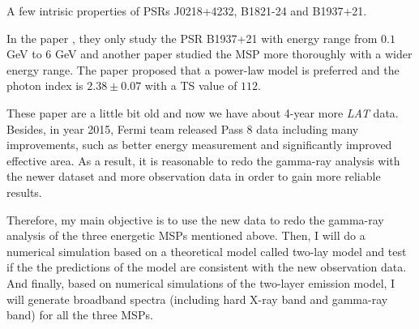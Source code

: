 \documentclass[12pt]{report}
\newcommand{\mycaption}[1]{\protect \caption{#1}}
\begin{document}
        \begin{table}[!htp]
          \centering
          \vspace{0.5cm}
            \centering
            \mycaption{A few intrisic properties of PSRs J0218+4232, B1821-24 and B1937+21. 
              \cite{ATNF} \cite{0004-637X-787-2-167} \cite{J1939_old}}
            \label{table: previous_spectra_property}
        \end{table}
        In the paper \cite{J1939_old}, they only study the PSR B1937+21 with energy range from 
        $0.1$ GeV to $6$ GeV and another paper \cite{0004-637X-787-2-167} studied the MSP more 
        thoroughly with a wider energy range. The paper proposed that a power-law model is 
        preferred and the photon index is $2.38\pm0.07$ with a TS value of $112$. 
        
        These paper are a little bit old and now we have about 4-year more \textit{LAT} data. 
        Besides, in year 2015, Fermi team released Pass 8 data including many improvements, 
        such as better energy measurement and significantly improved effective area. 
        As a result, it is reasonable to redo the gamma-ray analysis with the newer dataset and 
        more observation data in order to gain more reliable results. 

        Therefore, my main objective is to use the new data to redo the gamma-ray
        analysis of the three energetic MSPs mentioned above. Then, I will do a numerical
        simulation based on a theoretical model called two-lay model and test if the the 
        predictions of the model are consistent with the new observation data. And finally, based 
        on numerical simulations of the two-layer emission model, I will generate broadband 
        spectra (including hard X-ray band and gamma-ray band) for all the three MSPs. 
\end{document}
